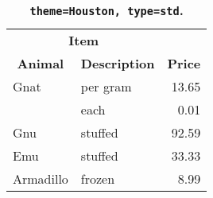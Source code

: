 \begin{table}[!htb]
\large
\centering
\setlength{\extrarowheight}{1pt}
\begin{tabular}{|l||l|r|}
\hline
\multicolumn{2}{|c|}{\textbf{Item}}    & \multicolumn{1}{c|}{\textbf{}}            \\
\multicolumn{1}{|c||}{\textbf{Animal}} & \multicolumn{1}{c|}{\textbf{Description}} & \multicolumn{1}{c|}{\textbf{Price}} \\
\hline
\hline
Gnat      & per gram & 13.65 \\
\hline
          & each     & 0.01  \\
\hline
Gnu       & stuffed  & 92.59 \\
\hline
Emu       & stuffed  & 33.33 \\
\hline
Armadillo & frozen   & 8.99  \\
\hline
\end{tabular}
\caption[\texttt{theme=Houston, type=std}]{\textbf{\texttt{theme=Houston, type=std}. }}
\end{table}
